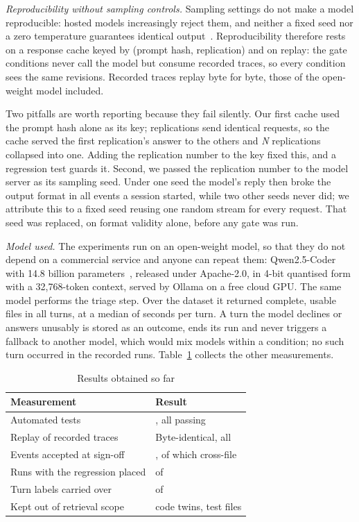 \documentclass[conference]{IEEEtran}
\begin{document}
\textit{Reproducibility without sampling controls.} Sampling settings do not make a model reproducible: hosted models increasingly reject them, and neither a fixed seed nor a zero temperature guarantees identical output~\cite{ouyang2025nondeterminism}. Reproducibility therefore rests on a response cache keyed by (prompt hash, replication) and on replay: the gate conditions never call the model but consume recorded traces, so every condition sees the same revisions. Recorded traces replay byte for byte, those of the open-weight model included.

Two pitfalls are worth reporting because they fail silently. Our first cache used the prompt hash alone as its key; replications send identical requests, so the cache served the first replication's answer to the others and \emph{N} replications collapsed into one. Adding the replication number to the key fixed this, and a regression test guards it. Second, we passed the replication number to the model server as its sampling seed. Under one seed the model's reply then broke the output format in all \nSeedEvents{} events a session started, while two other seeds never did; we attribute this to a fixed seed reusing one random stream for every request. That seed was replaced, on format validity alone, before any gate was run.

\textit{Model used.} The experiments run on an open-weight model, so that they do not depend on a commercial service and anyone can repeat them: Qwen2.5-Coder with 14.8 billion parameters~\cite{hui2024qwencoder}, released under Apache-2.0, in 4-bit quantised form with a 32,768-token context, served by Ollama on a free cloud GPU. The same model performs the triage step. Over the dataset it returned complete, usable files in all \nRunTurns{} turns, at a median of \nRunSeconds{} seconds per turn. A turn the model declines or answers unusably is stored as an outcome, ends its run and never triggers a fallback to another model, which would mix models within a condition; no such turn occurred in the recorded runs. Table~\ref{tab:status} collects the other measurements.

\begin{table}[t]
\caption{Results obtained so far}
\label{tab:status}
\centering
\footnotesize
\begin{tabular}{|p{4.3cm}|p{2.9cm}|}
\hline
\textbf{Measurement} & \textbf{Result} \\
\hline
Automated tests & \nTests{}, all passing \\
\hline
Replay of recorded traces & Byte-identical, all \nEventsSignedOff{} \\
\hline
Events accepted at sign-off & \nEventsSignedOff{}, of which \nEventsCross{} cross-file \\
\hline
Runs with the regression placed & \nRunPlaced{} of \nRunReps{} \\
\hline
Turn labels carried over & \nRunCarried{} of \nRunTurns{} \\
\hline
Kept out of retrieval scope & \nLeakTwins{} code twins, \nLeakTests{} test files \\
\hline
\end{tabular}
\end{table}
\end{document}
